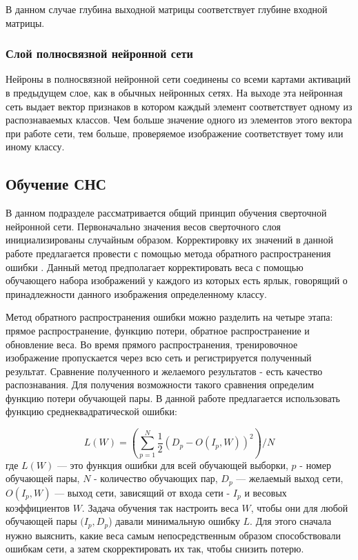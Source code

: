 \documentclass[14pt]{article}
\numberwithin{figure}{section}
\numberwithin{equation}{section}
\begin{document}
В данном случае глубина выходной матрицы соответствует глубине входной матрицы.

\subsubsection{Слой полносвязной нейронной сети}

Нейроны в полносвязной нейронной сети соединены со всеми картами активаций в предыдущем слое, как в обычных нейронных сетях. На выходе эта нейронная сеть выдает вектор признаков в котором каждый элемент соответствует одному из распознаваемых классов. Чем больше значение одного из элементов этого вектора при работе сети, тем больше, проверяемое изображение соответствует тому или иному классу.

\newpage

\subsection{Обучение СНС}

В данном подразделе рассматривается общий принцип обучения сверточной нейронной сети. Первоначально значения весов сверточного слоя инициализированы случайным образом. Корректировку их значений в данной работе предлагается провести с помощью метода обратного распространения ошибки \cite{MNBackProb}. Данный метод предполагает корректировать веса с помощью обучающего набора изображений у каждого из которых есть ярлык, говорящий о принадлежности данного изображения определенному классу.

Метод обратного распространения ошибки можно разделить на четыре этапа: прямое распространение, функцию потери, обратное распространение и обновление веса. Во время прямого распространения, тренировочное изображение пропускается через всю сеть и регистрируется полученный результат. Сравнение полученного и желаемого результатов - есть качество распознавания. Для получения возможности такого сравнения определим функцию потери обучающей пары. В данной работе предлагается использовать функцию среднеквадратической ошибки:

\begin{equation}
    L(W) = (\sum\limits_{p = 1}^{N} \frac{1}{2}(D_p - O(I_p, W))^2) / N
\end{equation}
где $L(W)$ — это функция ошибки для всей обучающей выборки, $p$ - номер обучающей пары, $N$ - количество обучающих пар, $D_p$ — желаемый выход сети, $O(I_p,W)$ — выход сети, зависящий от входа сети - $I_p$ и весовых коэффициентов $W$. Задача обучения так настроить веса $W$, чтобы они для любой обучающей пары $(I_p,D_p$) давали минимальную ошибку $L$. Для этого сначала нужно выяснить, какие веса самым непосредственным образом способствовали ошибкам сети, а затем скорректировать их так, чтобы снизить потерю.
\end{document}
